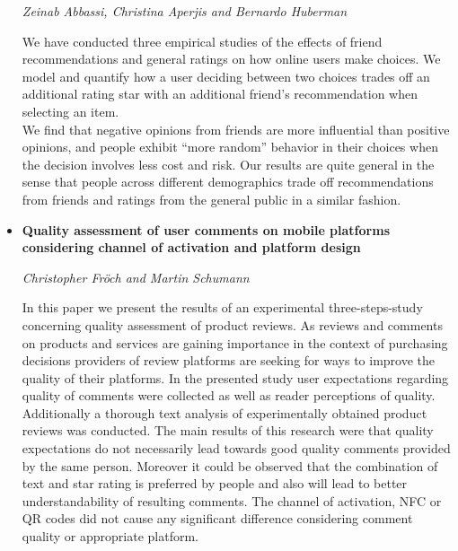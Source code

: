 \documentclass[a4paper,12pt,svgnames]{report}
\begin{document}
\begin{itemize}
\textit{Zeinab Abbassi, Christina Aperjis and Bernardo Huberman}

We have conducted three empirical studies of the effects of friend
recommendations and general ratings on how online users make choices.
We model and quantify how a user deciding between two choices trades off an
additional rating star with an additional friend's recommendation when selecting
an item.\\
We find that negative opinions from friends are more influential than positive
opinions, and people exhibit ``more random'' behavior in their choices when the
decision involves less cost and risk. Our results are quite general in the sense
that people across different demographics trade off recommendations from friends
and ratings from the general public in a similar fashion. 

\item \textbf{Quality assessment of user comments on mobile platforms
considering channel of activation and platform design}

\textit{Christopher Fröch and Martin Schumann}

In this paper we present the results of an experimental three-steps-study
concerning quality assessment of product reviews. As reviews and comments on
products and services are gaining importance in the context of purchasing
decisions providers of review platforms are seeking for ways to improve the
quality of their platforms. In the presented study user expectations regarding
quality of comments were collected as well as reader perceptions of quality.
Additionally a thorough text analysis of experimentally obtained product reviews
was conducted. The main results of this research were that quality expectations
do not necessarily lead towards good quality comments provided by the same
person. Moreover it could be observed that the combination of text and star
rating is preferred by people and also will lead to better understandability of
resulting comments. The channel of activation, NFC or QR codes did not cause any
significant difference considering comment quality or appropriate platform.

\end{itemize}
\end{document}
